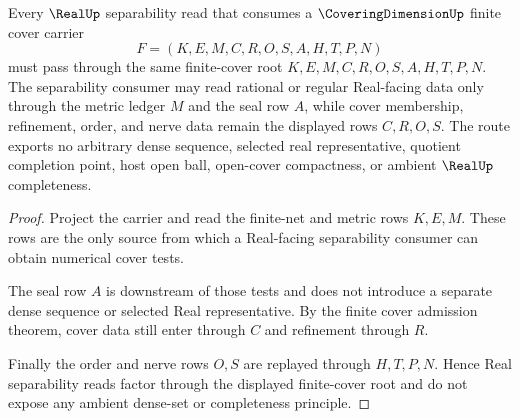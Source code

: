 \begin{theorem}
\label{thm:coveringdimension-finite-cover-root-real-separability-route}
Every $\RealUp$ separability read that consumes a $\CoveringDimensionUp$ finite cover carrier
$$
F=(K,E,M,C,R,O,S,A,H,T,P,N)
$$
must pass through the same finite-cover root $K,E,M,C,R,O,S,A,H,T,P,N$. The separability consumer may read rational or regular Real-facing data only through the metric ledger $M$ and the seal row $A$, while cover membership, refinement, order, and nerve data remain the displayed rows $C,R,O,S$. The route exports no arbitrary dense sequence, selected real representative, quotient completion point, host open ball, open-cover compactness, or ambient $\RealUp$ completeness.
\end{theorem}
\begin{proof}
Project the carrier and read the finite-net and metric rows $K,E,M$. These rows are the only source from which a Real-facing separability consumer can obtain numerical cover tests.

The seal row $A$ is downstream of those tests and does not introduce a separate dense sequence or selected Real representative. By the finite cover admission theorem, cover data still enter through $C$ and refinement through $R$.

Finally the order and nerve rows $O,S$ are replayed through $H,T,P,N$. Hence Real separability reads factor through the displayed finite-cover root and do not expose any ambient dense-set or completeness principle.
\end{proof}

